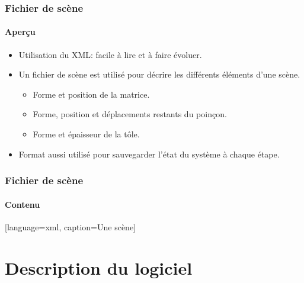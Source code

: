 \documentclass{beamer}
\begin{document}
\begin{frame}
    \frametitle{Fichier de scène}
    \framesubtitle{Aperçu}
    \begin{itemize}
        \item Utilisation du XML: facile à lire et à faire évoluer.
        \item Un fichier de scène est utilisé pour décrire les différents éléments d'une scène.
            \begin{itemize}
                \item Forme et position de la matrice.
                \item Forme, position et déplacements restants du poinçon.
                \item Forme et épaisseur de la tôle.
            \end{itemize}
        \item Format aussi utilisé pour sauvegarder l'état du système à chaque étape.
    \end{itemize}
\end{frame}
\begin{frame}
    \frametitle{Fichier de scène}
    \framesubtitle{Contenu}
    [language=xml, caption={Une scène}]
\end{frame}

\section{Description du logiciel}
\end{document}

